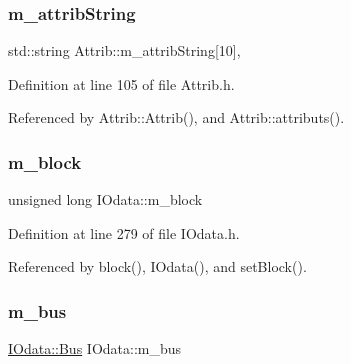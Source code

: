 \mbox{\label{classAttrib_a3414521d7a82476e874b25a5407b5e63}} 
\subsubsection{\texorpdfstring{m\+\_\+attrib\+String}{m\_attribString}}
{\footnotesize\ttfamily std\+::string Attrib\+::m\+\_\+attrib\+String\mbox{[}10\mbox{]}\hspace{0.3cm}{\ttfamily [protected]}, {\ttfamily [inherited]}}



Definition at line 105 of file Attrib.\+h.



Referenced by Attrib\+::\+Attrib(), and Attrib\+::attributs().

\mbox{\label{classIOdata_a6d1ce9f88db6b97ce61098a3693e253f}} 
\subsubsection{\texorpdfstring{m\+\_\+block}{m\_block}}
{\footnotesize\ttfamily unsigned long I\+Odata\+::m\+\_\+block\hspace{0.3cm}{\ttfamily [private]}}



Definition at line 279 of file I\+Odata.\+h.



Referenced by block(), I\+Odata(), and set\+Block().

\mbox{\label{classIOdata_a42c07a9b3f43ec35dd18d13a67d294cc}} 
\subsubsection{\texorpdfstring{m\+\_\+bus}{m\_bus}}
{\footnotesize\ttfamily \hyperlink{classIOdata_a99aa7bed39364c4359ab8a7596bc013c}{I\+Odata\+::\+Bus} I\+Odata\+::m\+\_\+bus\hspace{0.3cm}{\ttfamily [private]}}



